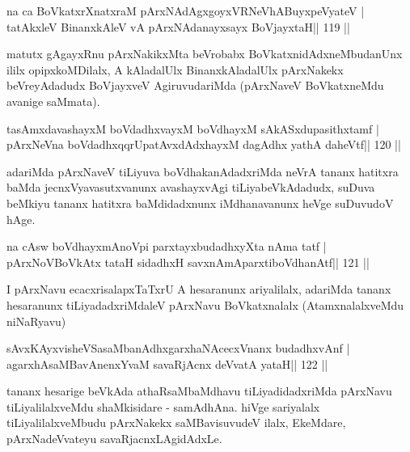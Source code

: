 \begin{shl}
na ca BoVkatxrXnatxraM pArxNAdAgxgoyxVRNeVhABuyxpeVyateV |
tatAkxleV BinanxkAleV vA pArxNAdanayxsayx BoVjayxtaH\hfill || 119 ||
\end{shl}

\begin{artha}
matutx gAgayxRnu pArxNakikxMta beVrobabx BoVkatxnidAdxneMbudanUnx ililx  opipxkoMDilalx, A kAladalUlx BinanxkAladalUlx pArxNakekx beVreyAdadudx BoVjayxveV AgiruvudariMda (pArxNaveV BoVkatxneMdu avanige saMmata).
\end{artha}

\begin{shl}
tasAmxdavashayxM boVdadhxvayxM boVdhayxM sAkASxdupasithxtamf |
pArxNeVna boVdadhxqqrUpatAvxdAdxhayxM dagAdhx yathA daheVtf\hfill || 120 ||
\end{shl}

\begin{artha}
adariMda pArxNaveV tiLiyuva boVdhakanAdadxriMda neVrA tananx hatitxra  baMda jecnxVyavasutxvanunx avashayxvAgi tiLiyabeVkAdadudx, suDuva beMkiyu tananx hatitxra baMdidadxnunx iMdhanavanunx heVge suDuvudoV hAge.
\end{artha}

\begin{shl}
na cAsw boVdhayxmAnoV\s pi parxtayxbudadhxyXta nAma tatf |
pArxNoV\s BoVkAtx tataH sidadhxH savxnAmAparxtiboVdhanAtf\hfill || 121 ||
\end{shl}

\begin{artha}
I pArxNavu ecacxrisalapxTaTxrU A hesaranunx ariyalilalx, adariMda tananx hesaranunx tiLiyadadxriMdaleV pArxNavu BoVkatxnalalx (AtamxnalalxveMdu niNaRyavu)
\end{artha}

\begin{shl}
sAvxKAyxvisheVSasaMbanAdhxgarxhaNAcecxVnanx budadhxvAnf |
agarxhAsaMBavAnenxYvaM savaRjAcnx deVvatA yataH\hfill || 122 ||
\end{shl}

\begin{artha}
tananx hesarige beVkAda athaRsaMbaMdhavu tiLiyadidadxriMda pArxNavu  tiLiyalilalxveMdu shaMkisidare - samAdhAna. hiVge sariyalalx  tiLiyalilalxveMbudu pArxNakekx saMBavisuvudeV ilalx, EkeMdare, pArxNadeVvateyu savaRjacnxLAgidAdxLe.
\end{artha}


